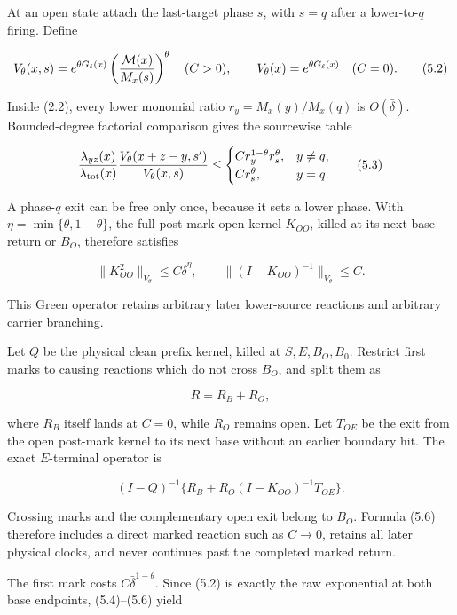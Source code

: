 At an open state attach the last-target phase \(s\), with \(s=q\) after
a lower-to-\(q\) firing. Define

\[
 V_\theta(x,s)=e^{\theta G_\ell(x)}
       \left({{\cal M}(x)\over M_x(s)}\right)^\theta
       \quad(C>0),
 \qquad
 V_\theta(x)=e^{\theta G_\ell(x)}\quad(C=0).               \tag{5.2}
\]

Inside (2.2), every lower monomial ratio \(r_y=M_x(y)/M_x(q)\) is
\(O(\bar\delta)\). Bounded-degree factorial comparison gives the
sourcewise table

\[
 {\lambda_{yz}(x)\over\lambda_{\rm tot}(x)}
 {V_\theta(x+z-y,s')\over V_\theta(x,s)}
 \le
 \begin{cases}
  C r_y^{1-\theta}r_s^\theta,&y\ne q,\\
  C r_s^\theta,&y=q.
 \end{cases}                                                \tag{5.3}
\]

A phase-\(q\) exit can be free only once, because it sets a lower phase.
With \(\eta=\min\{\theta,1-\theta\}\), the full post-mark open kernel
\(K_{OO}\), killed at its next base return or \(B_O\), therefore
satisfies

\[
 \|K_{OO}^2\|_{V_\theta}\le C\bar\delta^\eta,
 \qquad
 \|(I-K_{OO})^{-1}\|_{V_\theta}\le C.                      \tag{5.4}
\]

This Green operator retains arbitrary later lower-source reactions and
arbitrary carrier branching.

Let \(Q\) be the physical clean prefix kernel, killed at
\(S,E,B_O,B_0\). Restrict first marks to causing reactions which do not
cross \(B_O\), and split them as

\[
                         R=R_B+R_O,                         \tag{5.5}
\]

where \(R_B\) itself lands at \(C=0\), while \(R_O\) remains open. Let
\(T_{OE}\) be the exit from the open post-mark kernel to its next base
without an earlier boundary hit. The exact \(E\)-terminal operator is

\[
       (I-Q)^{-1}
       \{R_B+R_O(I-K_{OO})^{-1}T_{OE}\}.                    \tag{5.6}
\]

Crossing marks and the complementary open exit belong to \(B_O\).
Formula (5.6) therefore includes a direct marked reaction such as
\(C\to0\), retains all later physical clocks, and never continues past
the completed marked return.

The first mark costs \(C\bar\delta^{1-\theta}\). Since (5.2) is exactly
the raw exponential at both base endpoints, (5.4)--(5.6) yield

